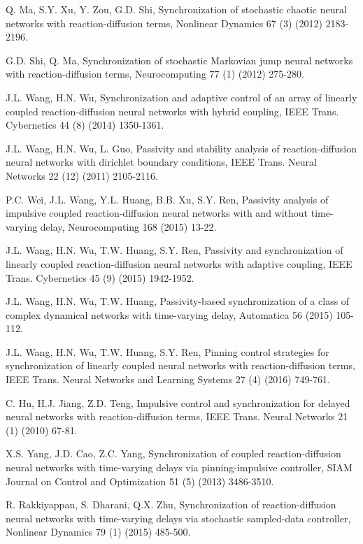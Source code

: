 \documentclass[review]{elsarticle}
\begin{document}
\begin{thebibliography}{99}
Q. Ma, S.Y. Xu, Y. Zou, G.D. Shi, Synchronization of stochastic chaotic neural networks with reaction-diffusion terms, Nonlinear Dynamics 67 (3) (2012) 2183-2196.

G.D. Shi, Q. Ma, Synchronization of stochastic Markovian jump neural networks with reaction-diffusion terms, Neurocomputing 77 (1) (2012) 275-280.

J.L. Wang, H.N. Wu, Synchronization and adaptive control of an array of linearly coupled reaction-diffusion neural networks with hybrid coupling, IEEE Trans. Cybernetics 44 (8) (2014) 1350-1361.

J.L. Wang, H.N. Wu, L. Guo, Passivity and stability analysis of reaction-diffusion neural networks with dirichlet boundary conditions, IEEE Trans. Neural Networks 22 (12) (2011) 2105-2116.

P.C. Wei, J.L. Wang, Y.L. Huang, B.B. Xu, S.Y. Ren, Passivity analysis of impulsive coupled reaction-diffusion neural networks with and without time-varying delay, Neurocomputing 168 (2015) 13-22.

J.L. Wang, H.N. Wu, T.W. Huang, S.Y. Ren, Passivity and synchronization of linearly coupled reaction-diffusion neural networks with adaptive coupling, IEEE Trans. Cybernetics 45 (9) (2015) 1942-1952.

J.L. Wang, H.N. Wu, T.W. Huang, Passivity-based synchronization of a class of complex dynamical networks with time-varying delay, Automatica 56 (2015) 105-112.

J.L. Wang, H.N. Wu, T.W. Huang, S.Y. Ren, Pinning control strategies for synchronization of linearly coupled neural networks with reaction-diffusion terms, IEEE Trans. Neural Networks and Learning Systems 27 (4) (2016) 749-761.

C. Hu, H.J. Jiang, Z.D. Teng, Impulsive control and synchronization for delayed neural networks with reaction-diffusion terms, IEEE Trans. Neural Networks 21 (1) (2010) 67-81.

X.S. Yang, J.D. Cao, Z.C. Yang, Synchronization of coupled reaction-diffusion neural networks with time-varying delays via pinning-impulsive controller, SIAM Journal on Control and Optimization 51 (5) (2013) 3486-3510.

R. Rakkiyappan, S. Dharani, Q.X. Zhu, Synchronization of reaction-diffusion neural networks with time-varying delays via stochastic sampled-data controller, Nonlinear Dynamics 79 (1) (2015) 485-500.


\end{thebibliography}
\end{document}
